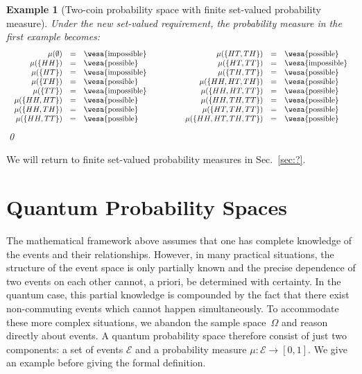 \documentclass{article}
\theoremstyle{indented}
\newtheorem{example}{Example}
\newcommand{\qevents}{\ensuremath{\mathcal{E}}}
\newcommand{\pmeas}{\ensuremath{\mu}}
\newcommand{\poss}{{\mbox{\wesa{possible}}}}
\newcommand{\imposs}{{\mbox{\wesa{impossible}}}}
\begin{document}
\begin{example}[Two-coin probability space with finite set-valued
  probability measure] Under the new set-valued requirement, the
  probability measure in the first example becomes:
\[\begin{array}{c@{\qquad\qquad}c}
\begin{array}{rcl}
\pmeas(\emptyset) &=& \imposs \\
\pmeas(\{ HH \}) &=& \poss \\
\pmeas(\{ HT \}) &=& \imposs \\
\pmeas(\{ TH \}) &=& \poss \\
\pmeas(\{ TT \}) &=& \imposs \\
\pmeas(\{  HH, HT \}) &=& \poss \\
\pmeas(\{  HH, TH \}) &=& \poss \\
\pmeas(\{  HH , TT \}) &=& \poss \\
\end{array} & \begin{array}{rcl}
\pmeas(\{  HT, TH \}) &=& \poss \\
\pmeas(\{  HT , TT \}) &=& \imposs \\
\pmeas(\{  TH , TT \}) &=& \poss \\
\pmeas(\{  HH, HT, TH \}) &=& \poss \\
\pmeas(\{  HH, HT, TT \}) &=& \poss \\
\pmeas(\{  HH, TH, TT \}) &=& \poss \\
\pmeas(\{  HT, TH, TT \}) &=& \poss \\
\pmeas(\{  HH, HT, TH, TT \}) &=& \poss 
\end{array}
\end{array}\]
\qed\end{example}

We will return to finite set-valued probability measures in Sec.~\ref{sec:?}.

\section{Quantum Probability Spaces}

The mathematical framework above assumes that one has complete
knowledge of the events and their relationships. However, in many
practical situations, the structure of the event space is only
partially known and the precise dependence of two events on each other
cannot, a priori, be determined with certainty. In the quantum case,
this partial knowledge is compounded by the fact that there exist
non-commuting events which cannot happen simultaneously. To
accommodate these more complex situations, we abandon the sample
space~$\Omega$ and reason directly about events. A quantum probability
space therefore consist of just two components: a set of events
$\qevents$ and a probability measure
$\mu : \qevents \rightarrow [0,1]$. We give an example before giving
the formal definition.
\end{document}
